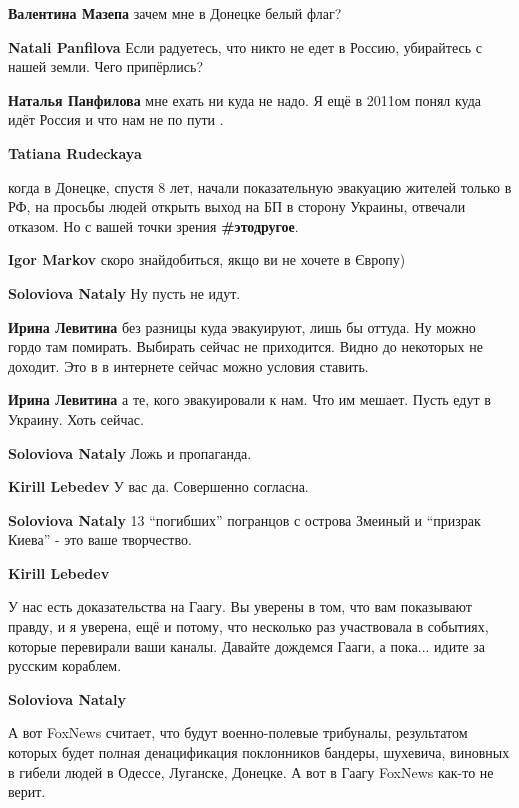 \begin{itemize}
\begin{itemize}
\textbf{Валентина Мазепа} зачем мне в Донецке белый флаг?

\textbf{Natali Panfilova} Если радуетесь, что никто не едет в Россию, убирайтесь с нашей земли. Чего припёрлись?

\textbf{Наталья Панфилова} мне ехать ни куда не надо. Я ещё в 2011ом понял куда идёт Россия и что нам не по пути .

\textbf{Tatiana Rudeckaya} 

когда в Донецке, спустя 8 лет, начали показательную эвакуацию жителей только в
РФ, на просьбы людей открыть выход на БП в сторону Украины, отвечали отказом.
Но с вашей точки зрения \textbf{\#этодругое}.

\textbf{Igor Markov} скоро знайдобиться, якщо ви не хочете в Європу)

\textbf{Soloviova Nataly} Ну пусть не идут.

\textbf{Ирина Левитина} без разницы куда эвакуируют, лишь бы оттуда. Ну можно гордо там помирать. Выбирать сейчас не приходится. Видно до некоторых не доходит. Это в в интернете сейчас можно условия ставить.

\textbf{Ирина Левитина} а те, кого эвакуировали к нам. Что им мешает. Пусть едут в Украину. Хоть сейчас.

\textbf{Soloviova Nataly} Ложь и пропаганда.

\textbf{Kirill Lebedev} У вас да. Совершенно согласна.

\textbf{Soloviova Nataly} 13 \enquote{погибших} погранцов с острова Змеиный и \enquote{призрак Киева} - это ваше творчество.

\textbf{Kirill Lebedev} 

У нас есть доказательства на Гаагу. Вы уверены в том, что вам показывают
правду, и я уверена, ещё и потому, что несколько раз участвовала в событиях,
которые перевирали ваши каналы. Давайте дождемся Гааги, а пока... идите за
русским кораблем.


\textbf{Soloviova Nataly} 

А вот FoxNews считает, что будут военно-полевые трибуналы, результатом которых
будет полная денацификация поклонников бандеры, шухевича, виновных в гибели
людей в Одессе, Луганске, Донецке. А вот в Гаагу FoxNews как-то не верит.


\end{itemize}
\end{itemize}
